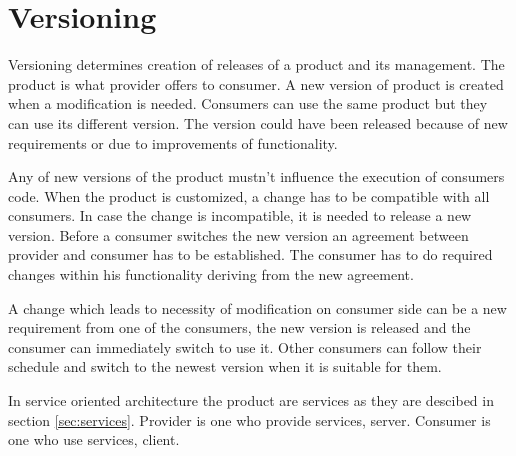 \chapter{Versioning}
\label{chap:versioning}

Versioning determines creation of releases of a product and its management. The product is what provider offers to consumer. A new version of product is created when a modification is needed. Consumers can use the same product but they can use its different version. The version could have been released because of new requirements or due to improvements of functionality. 

Any of new versions of the product mustn't influence the execution of consumers code. When the product is customized, a change has to be compatible with all consumers. In case the change is incompatible, it is needed to release a new version. Before a consumer switches the new version an agreement between provider and consumer has to be established. The consumer has to do required changes within his functionality deriving from the new agreement.

A change which leads to necessity of modification on consumer side can be a new requirement from one of the consumers, the new version is released and the consumer can immediately switch to use it. Other consumers can follow their schedule and switch to the newest version when it is suitable for them. 

In service oriented architecture the product are services as they are descibed in section \ref{sec:services}. Provider is one who provide services, server. Consumer is one who use services, client.

